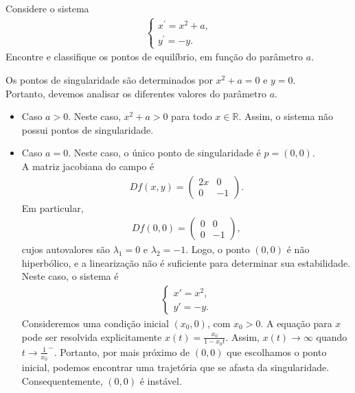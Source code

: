 \begin{homeworkProblem}[2]
  Considere o sistema
  \begin{align*}
    \begin{cases}
      x^{\prime}=x^2+a\text{,} \\
      y^{\prime}=-y.
    \end{cases}
  \end{align*}
  Encontre e classifique os pontos de equilíbrio, em função do parâmetro $a$.
  \begin{solution}
    Os pontos de singularidade são determinados por $x^2+a=0$ e $y=0$.\\
    Portanto, devemos analisar os diferentes valores do parâmetro $a$.
    \begin{itemize}
      \item Caso $a>0$.
        Neste caso, $x^2+a>0$ para todo $x\in\mathbb{R}$. Assim, o sistema não possui pontos de singularidade.
      \item Caso $a=0$.
        Neste caso, o único ponto de singularidade é $p=(0,0)$.\\
        A matriz jacobiana do campo é
        \begin{align*}
         Df(x,y)=\begin{pmatrix}
          2x & 0\\
          0 & -1
          \end{pmatrix}.
        \end{align*}
        Em particular,
        \begin{align*}
          Df(0,0)=\begin{pmatrix}
            0 & 0\\
            0 & -1
          \end{pmatrix},
        \end{align*}
        cujos autovalores são $\lambda_1=0$ e $\lambda_2=-1$. Logo, o ponto $(0,0)$ é não hiperbólico, e a linearização não é suficiente para determinar sua estabilidade.\\
        Neste caso, o sistema é
        \begin{align*}
          \begin{cases}
            x'=x^2,\\
            y'=-y.
          \end{cases}
        \end{align*}
        Consideremos uma condição inicial $(x_0,0)$, com $x_0>0$. A equação para $x$ pode ser resolvida explicitamente $x(t)=\frac{x_0}{1-x_0t}$. Assim, $x(t)\to\infty$ quando $t\to\frac{1}{x_0}^{-}$. Portanto, por mais próximo de $(0,0)$ que escolhamos o ponto inicial, podemos encontrar uma trajetória que se afasta da singularidade. Consequentemente, $(0,0)$ é instável.\\

\end{itemize}
\end{solution}
\end{homeworkProblem}

